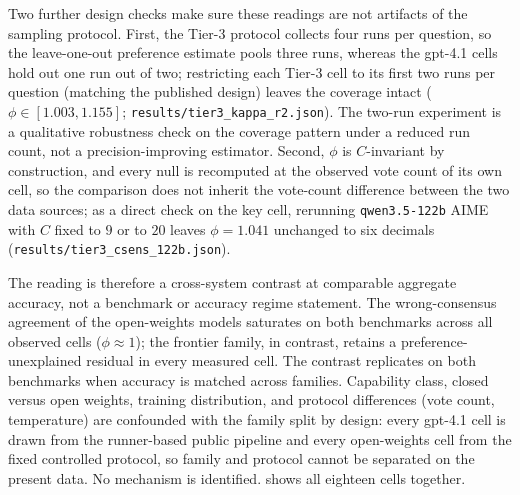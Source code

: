\documentclass[a4paper,fleqn]{cas-sc}
\begin{document}
Two further design checks make sure these readings are not artifacts
of the sampling protocol. First, the Tier-3 protocol collects four runs
per question, so the leave-one-out preference estimate pools three runs,
whereas the gpt-4.1 cells hold out one run out of two; restricting each
Tier-3 cell to its first two runs per question (matching the published
design) leaves the coverage intact
($\phi\in[1.003,1.155]$;
\texttt{results/tier3\_kappa\_r2.json}). The two-run
experiment is a qualitative robustness check on the coverage pattern
under a reduced run count, not a precision-improving estimator. Second,
$\phi$ is $C$-invariant by construction, and every null is recomputed at
the observed vote count of its own cell, so the comparison does not
inherit the vote-count difference between the two data sources; as a
direct check on the key cell, rerunning \texttt{qwen3.5-122b} AIME
with $C$ fixed to $9$ or to $20$ leaves $\phi=1.041$ unchanged to six
decimals (\texttt{results/tier3\_csens\_122b.json}).

The reading is therefore a cross-system
contrast at comparable aggregate accuracy, not a benchmark or accuracy
regime statement. The
wrong-consensus agreement of the open-weights models saturates
on both benchmarks across all observed cells
($\phi\approx1$); the frontier family, in contrast, retains a
preference-unexplained residual in every measured cell. The contrast
replicates on both benchmarks when accuracy is matched across families.
Capability class, closed versus open weights, training distribution, and
protocol differences (vote count, temperature) are confounded
with the family split by design: every gpt-4.1 cell is drawn from the
runner-based public pipeline and every open-weights cell from the fixed
controlled protocol, so family and protocol cannot be separated on the
present data. No
mechanism is identified.
 shows all eighteen cells together.
\end{document}
